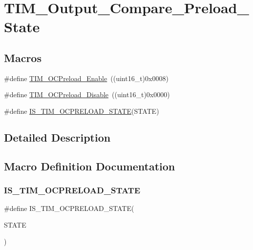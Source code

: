 \hypertarget{group___t_i_m___output___compare___preload___state}{}\section{T\+I\+M\+\_\+\+Output\+\_\+\+Compare\+\_\+\+Preload\+\_\+\+State}
\label{group___t_i_m___output___compare___preload___state}
\subsection*{Macros}
\begin{DoxyCompactItemize}
\item 
\#define \mbox{\hyperlink{group___t_i_m___output___compare___preload___state_gad647db2e7a89bd6db3c787680afccf8f}{T\+I\+M\+\_\+\+O\+C\+Preload\+\_\+\+Enable}}~((uint16\+\_\+t)0x0008)
\item 
\#define \mbox{\hyperlink{group___t_i_m___output___compare___preload___state_ga0cbcc3c4d90d61d85550db2173737ed6}{T\+I\+M\+\_\+\+O\+C\+Preload\+\_\+\+Disable}}~((uint16\+\_\+t)0x0000)
\item 
\#define \mbox{\hyperlink{group___t_i_m___output___compare___preload___state_ga48cc07c5e87b5fd7549b7668f1598ab5}{I\+S\+\_\+\+T\+I\+M\+\_\+\+O\+C\+P\+R\+E\+L\+O\+A\+D\+\_\+\+S\+T\+A\+TE}}(S\+T\+A\+TE)
\end{DoxyCompactItemize}


\subsection{Detailed Description}


\subsection{Macro Definition Documentation}
\mbox{\label{group___t_i_m___output___compare___preload___state_ga48cc07c5e87b5fd7549b7668f1598ab5}} 
\subsubsection{\texorpdfstring{IS\_TIM\_OCPRELOAD\_STATE}{IS\_TIM\_OCPRELOAD\_STATE}}
{\footnotesize\ttfamily \#define I\+S\+\_\+\+T\+I\+M\+\_\+\+O\+C\+P\+R\+E\+L\+O\+A\+D\+\_\+\+S\+T\+A\+TE(\begin{DoxyParamCaption}\item[{}]{S\+T\+A\+TE }\end{DoxyParamCaption})}

